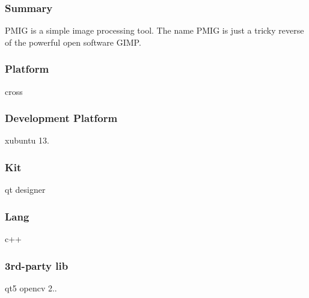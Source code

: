 \subsubsection*{Summary}

P\-M\-I\-G is a simple image processing tool. The name P\-M\-I\-G is just a tricky reverse of the powerful open software G\-I\-M\-P. \subsubsection*{Platform}

cross \subsubsection*{Development Platform}

xubuntu 13. \subsubsection*{Kit}

qt designer \subsubsection*{Lang}

c++ \subsubsection*{3rd-\/party lib}

qt5 opencv 2.. 